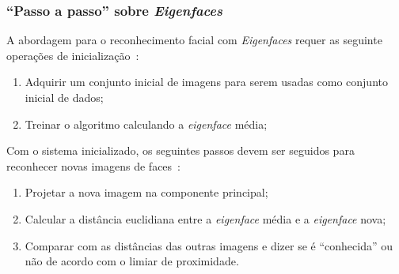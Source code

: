 \subsubsection{``Passo a passo'' sobre \textit{Eigenfaces}}

	A abordagem para o reconhecimento facial com \textit{Eigenfaces} requer as
	seguinte operações de inicialização~\cite{turk}:

	\begin{enumerate}
		\item Adquirir um conjunto inicial de imagens para serem usadas como conjunto inicial de dados;
		\item Treinar o algoritmo calculando a \textit{eigenface} média;
	\end{enumerate}

	Com o sistema inicializado, os seguintes passos devem ser seguidos para
	reconhecer novas imagens de faces~\cite{turk}:
	
	\begin{enumerate}
		\item Projetar a nova imagem na componente principal;
		\item Calcular a distância euclidiana entre a \textit{eigenface} média e a \textit{eigenface} nova;
		\item Comparar com as distâncias das outras imagens e dizer se é ``conhecida'' ou não de acordo com o limiar de proximidade.
	\end{enumerate}